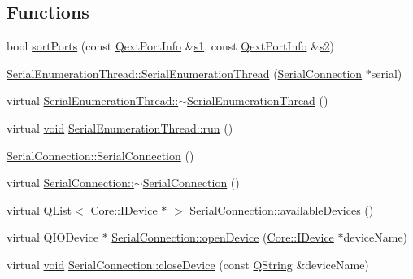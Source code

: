\subsection*{Functions}
\begin{DoxyCompactItemize}
\item 
bool \hyperlink{group___serial_plugin_gad78f86e2b854b6285de51dbf32711129}{sort\-Ports} (const \hyperlink{struct_qext_port_info}{Qext\-Port\-Info} \&\hyperlink{_o_p_plots_8m_a2f07e0f444810cc4e54ee2be2ce0ac65}{s1}, const \hyperlink{struct_qext_port_info}{Qext\-Port\-Info} \&\hyperlink{_o_p_plots_8m_a2e63e71737e8b6802b81f6a7c5ca6a0a}{s2})
\item 
\hyperlink{group___serial_plugin_ga289f1853507d6f6b1bfdd1dd31284c31}{Serial\-Enumeration\-Thread\-::\-Serial\-Enumeration\-Thread} (\hyperlink{class_serial_connection}{Serial\-Connection} $\ast$serial)
\item 
virtual \hyperlink{group___serial_plugin_gaf247ad3a1a6b6c85a885aaaa1675cd48}{Serial\-Enumeration\-Thread\-::$\sim$\-Serial\-Enumeration\-Thread} ()
\item 
virtual \hyperlink{group___u_a_v_objects_plugin_ga444cf2ff3f0ecbe028adce838d373f5c}{void} \hyperlink{group___serial_plugin_gab90979605ec84bd0383575c2b10f18d0}{Serial\-Enumeration\-Thread\-::run} ()
\item 
\hyperlink{group___serial_plugin_gaad6479d49b3483b42c19868c9efcef01}{Serial\-Connection\-::\-Serial\-Connection} ()
\item 
virtual \hyperlink{group___serial_plugin_gae73749bb08c2f53f467809cb6c0a3fc8}{Serial\-Connection\-::$\sim$\-Serial\-Connection} ()
\item 
virtual \hyperlink{class_q_list}{Q\-List}$<$ \hyperlink{class_core_1_1_i_device}{Core\-::\-I\-Device} $\ast$ $>$ \hyperlink{group___serial_plugin_ga35f8b088eb3166e3e81cc71809806085}{Serial\-Connection\-::available\-Devices} ()
\item 
virtual Q\-I\-O\-Device $\ast$ \hyperlink{group___serial_plugin_gacbed38aeba722578f369ad9b4ef2b822}{Serial\-Connection\-::open\-Device} (\hyperlink{class_core_1_1_i_device}{Core\-::\-I\-Device} $\ast$device\-Name)
\item 
virtual \hyperlink{group___u_a_v_objects_plugin_ga444cf2ff3f0ecbe028adce838d373f5c}{void} \hyperlink{group___serial_plugin_gaa5933c2426d549fd1621d1e29529e517}{Serial\-Connection\-::close\-Device} (const \hyperlink{group___u_a_v_objects_plugin_gab9d252f49c333c94a72f97ce3105a32d}{Q\-String} \&device\-Name)
\item 

\end{DoxyCompactItemize}
